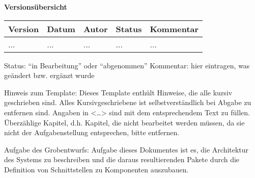 
{\textbf{Versionsübersicht}}\\[2ex]

\begin{longtable}{|m{1.78cm}|m{1.59cm}|m{2.86cm}|m{1.9cm}|m{5.25cm}|}

  \hline                                              %

  \textbf{Version}  &    \textbf{Datum}  &    \textbf{Autor}  &
  \textbf{Status}   &    \textbf{Kommentar}       \\  %
  \hline                                              %

  ...    &    ...    &    ...    &    ...    &    ...\\       %
  \hline                                              %

\end{longtable}

Status: "`in Bearbeitung"' oder "`abgenommen"'
Kommentar: hier eintragen, was ge\"andert bzw. ergänzt wurde


Hinweis zum Template:
Dieses Template enth\"ult Hinweise, die alle kursiv geschrieben sind. Alles
Kursivgeschriebene ist selbstverst\"andlich bei Abgabe zu entfernen sind.
Angaben in <\ldots> sind mit dem entsprechendem Text zu f\"ullen.  \"Uberz\"ahlige
Kapitel, d.h. Kapitel, die nicht bearbeitet werden m\"ussen, da sie nicht der
Aufgabenstellung entsprechen, bitte entfernen.

Aufgabe des Grobentwurfs: Aufgabe dieses Dokumentes ist es, die Architektur des
Systems zu beschreiben und die daraus resultierenden Pakete durch die
Definition von Schnittstellen zu Komponenten auszubauen.
